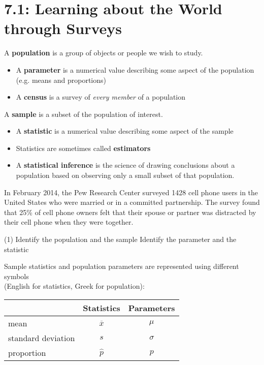 \documentclass[../mathNotesPreamble]{subfiles}
\providecommand{\relscalefact}{1.4}
\begin{document}
\relscale{\relscalefact}
  \section{7.1: Learning about the World through Surveys}

    \begin{defn*}
      A \textbf{population} is a group of objects or people we wish to study.
      \begin{itemize}
        \item A \textbf{parameter} is a numerical value describing some aspect of the population\\ (e.g. means and proportions)
        \item A \textbf{census} is a survey of \emph{every member} of a population
      \end{itemize}
      A \textbf{sample} is a subset of the population of interest.
      \begin{itemize}
        \item A \textbf{statistic} is a numerical value describing some aspect of the sample
        \item Statistics are sometimes called \textbf{estimators}
        \item A \textbf{statistical inference} is the science of drawing conclusions about a population based on observing only a small subset of that population.
      \end{itemize}
    \end{defn*}

    \begin{ex*}
      In February 2014, the Pew Research Center surveyed 1428 cell phone users in the United States who were married or in a committed partnership. The survey found that 25\% of cell phone owners felt that their spouse or partner was distracted by their cell phone when they were together.
    \end{ex*}

    \begin{extasks}[after-item-skip=\stretch{1}](1)
      \task Identify the population and the sample
      \task Identify the parameter and the statistic
    \end{extasks}
    \pagebreak

    \noindent
    Sample statistics and population parameters are represented using different symbols\\ (English for statistics, Greek for population):
    \begin{center}
      \begin{tabular}{@{}l*{2}{c}@{}}\toprule
        & Statistics & Parameters \\\midrule
        mean & $\overline{x}$ & $\mu$ \\
        standard deviation & $s$ & $\sigma$\\
        proportion & $\hat{p}$ & $p$\\\bottomrule
      \end{tabular}
    \end{center}
\end{document}
